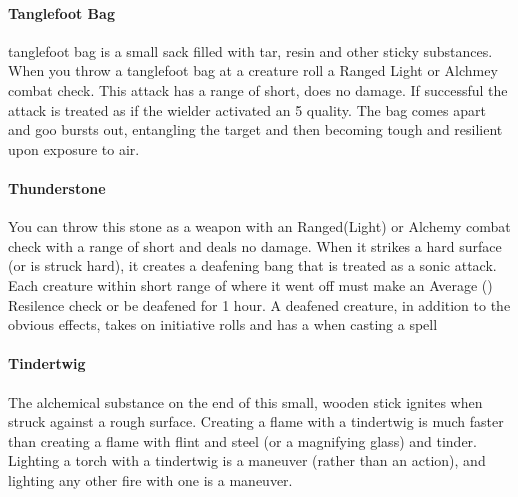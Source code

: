 \begin{multicols}{2}
\paragraph{Tanglefoot Bag} \label{alcitm:tanglefootbag}
tanglefoot bag is a small sack filled with tar, resin
and other sticky substances. When you throw a
tanglefoot bag at a creature roll a Ranged Light or
Alchmey combat check. This attack has a range of
short, does no damage. If successful the attack is treated
as if the wielder activated an  5 quality. The
bag comes apart and goo bursts out, entangling the
target and then becoming tough and resilient upon
exposure to air.

\paragraph{Thunderstone} \label{alcitm:thunderstone}
You can throw this stone as a weapon with an Ranged(Light) or
Alchemy combat check with a range of short and deals no damage.
When it strikes a hard surface (or is struck hard), it creates
a deafening bang that is treated as a sonic attack. Each creature
within short range of where it went off must make an Average
(\difficulty\difficulty) Resilence check or be deafened for 1
hour. A deafened creature, in addition to the obvious effects,
takes \setback\setback on initiative rolls and has a \setback
when casting a spell

\paragraph{Tindertwig} \label{alcitm:tindertwig}
The alchemical substance on the end of this small,
wooden stick ignites when struck against a rough
surface. Creating a flame with a tindertwig is much
faster than creating a flame with flint and steel (or a
magnifying glass) and tinder. Lighting a torch with a
tindertwig is a maneuver (rather than an action), and
lighting any other fire with one is a maneuver.

\end{multicols}
